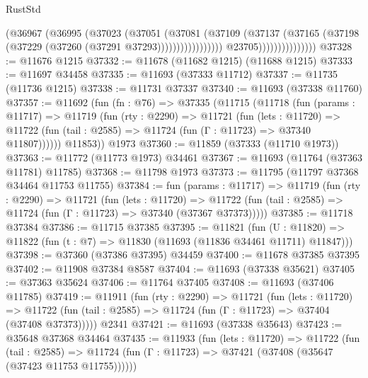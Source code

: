 \begin{lexlean}{RustStd}
\begin{coremodule}
                                            (@36967
                                              (@36995
                                                (@37023
                                                  (@37051
                                                    (@37081
                                                      (@37109
                                                        (@37137
                                                          (@37165
                                                            (@37198
                                                              (@37229
                                                                (@37260
                                                                  (@37291 @37293)))))))))))))))))
                                  @23705)))))))))))))))
@37328 := @11676 @1215
@37332 := @11678 (@11682 @1215) (@11688 @1215)
@37333 := @11697 @34458
@37335 := @11693 (@37333 @11712)
@37337 := @11735 (@11736 @1215)
@37338 := @11731 @37337
@37340 := @11693 (@37338 @11760)
@37357 := @11692
    (fun (fn : @76) =>
    @37335
      (@11715
        (@11718
          (fun (params : @11717) =>
          @11719
            (fun (rty : @2290) =>
            @11721
              (fun (lets : @11720) =>
              @11722 (fun (tail : @2585) => @11724 (fun (Γ : @11723) => @37340 @11807))))))
        @11853))
    @1973
@37360 := @11859 (@37333 (@11710 @1973))
@37363 := @11772 (@11773 @1973) @34461
@37367 := @11693 (@11764 (@37363 @11781) @11785)
@37368 := @11798 @1973
@37373 := @11795 (@11797 @37368 @34464 @11753 @11755)
@37384 := fun (params : @11717) =>
  @11719
    (fun (rty : @2290) =>
    @11721
      (fun (lets : @11720) =>
      @11722 (fun (tail : @2585) => @11724 (fun (Γ : @11723) => @37340 (@37367 @37373)))))
@37385 := @11718 @37384
@37386 := @11715 @37385
@37395 := @11821
    (fun (U : @11820) => @11822 (fun (t : @7) => @11830 (@11693 (@11836 @34461 @11711) @11847)))
@37398 := @37360 (@37386 @37395) @34459
@37400 := @11678 @37385 @37395
@37402 := @11908 @37384 @8587
@37404 := @11693 (@37338 @35621)
@37405 := @37363 @35624
@37406 := @11764 @37405
@37408 := @11693 (@37406 @11785)
@37419 := @11911
    (fun (rty : @2290) =>
    @11721
      (fun (lets : @11720) =>
      @11722 (fun (tail : @2585) => @11724 (fun (Γ : @11723) => @37404 (@37408 @37373)))))
    @2341
@37421 := @11693 (@37338 @35643)
@37423 := @35648 @37368 @34464
@37435 := @11933
    (fun (lets : @11720) =>
    @11722
      (fun (tail : @2585) =>
      @11724 (fun (Γ : @11723) => @37421 (@37408 (@35647 (@37423 @11753 @11755))))))

\end{coremodule}
\end{lexlean}
